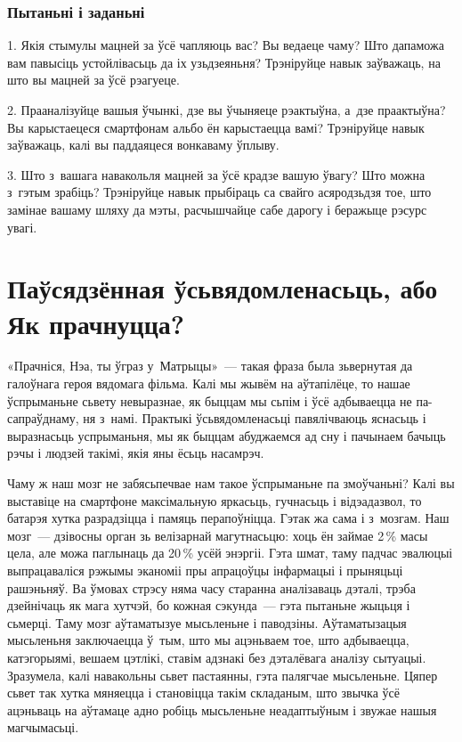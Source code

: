 \subsubsection{Пытаньні і заданьні}

1. Якія стымулы мацней за ўсё чапляюць вас? Вы ведаеце чаму? Што дапаможа вам павысіць устойлівасьць да іх узьдзеяньня? Трэніруйце навык заўважаць, на што вы мацней за ўсё рэагуеце.

2. Прааналізуйце вашыя ўчынкі, дзе вы ўчыняеце рэактыўна, а~дзе праактыўна? Вы карыстаецеся смартфонам альбо ён карыстаецца вамі? Трэніруйце навык заўважаць, калі вы паддаяцеся вонкаваму ўплыву.

3. Што з~вашага навакольля мацней за ўсё крадзе вашую ўвагу? Што можна з~гэтым зрабіць? Трэніруйце навык прыбіраць са свайго асяродзьдзя тое, што замінае вашаму шляху да мэты, расчышчайце сабе дарогу і беражыце рэсурс увагі.


\section{Паўсядзённая ўсьвядомленасьць, або Як прачнуцца?}

«Прачніся, Нэа, ты ўграз у~Матрыцы»~--- такая фраза была зьвернутая да галоўнага героя вядомага фільма. Калі мы жывём на аўтапілёце, то нашае ўспрыманьне сьвету невыразнае, як быццам мы сьпім і ўсё адбываецца не па-сапраўднаму, ня з~намі. Практыкі ўсьвядомленасьці павялічваюць яснасьць і выразнасьць успрыманьня, мы як быццам абуджаемся ад сну і пачынаем бачыць рэчы і людзей такімі, якія яны ёсьць насамрэч.

Чаму ж наш мозг не забясьпечвае нам такое ўспрыманьне па змоўчаньні? Калі вы выставіце на смартфоне максімальную яркасьць, гучнасьць і відэадазвол, то батарэя хутка разрадзіцца і памяць перапоўніцца. Гэтак жа сама і з~мозгам. Наш мозг~--- дзівосны орган зь велізарнай магутнасьцю: хоць ён займае 2\,\% масы цела, але можа паглынаць да 20\,\% усёй энэргіі. Гэта шмат, таму падчас эвалюцыі выпрацаваліся рэжымы эканоміі пры апрацоўцы інфармацыі і прыняцьці рашэньняў. Ва ўмовах стрэсу няма часу старанна аналізаваць дэталі, трэба дзейнічаць як мага хутчэй, бо кожная сэкунда~--- гэта пытаньне жыцьця і сьмерці. Таму мозг аўтаматызуе мысьленьне і паводзіны. Аўтаматызацыя мысьленьня заключаецца ў~тым, што мы ацэньваем тое, што адбываецца, катэгорыямі, вешаем цэтлікі, ставім адзнакі без дэталёвага аналізу сытуацыі. Зразумела, калі навакольны сьвет пастаянны, гэта палягчае мысьленьне. Цяпер сьвет так хутка мяняецца і становіцца такім складаным, што звычка ўсё ацэньваць на аўтамаце адно робіць мысьленьне неадаптыўным і звужае нашыя магчымасьці.

